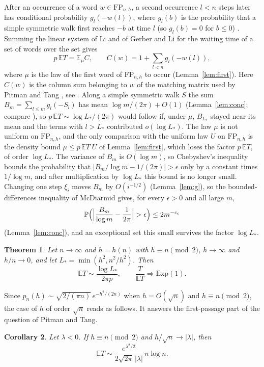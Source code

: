 \documentclass[11pt]{amsart}
\newtheorem{theorem}{Theorem}[section]
\newtheorem{corollary}[theorem]{Corollary}
\theoremstyle{remark}
\numberwithin{equation}{section}
\newcommand{\PP}{\mathbb{P}}
\newcommand{\EE}{\mathbb{E}}
\newcommand{\FP}{\mathrm{FP}}
\begin{document}
After an occurrence of a word $w\in\FP_{n,h}$, a second occurrence $l<n$ steps later has conditional probability $g_l(-w(l))$, where $g_l(b)$ is the probability that a simple symmetric walk first reaches $-b$ at time $l$ (so $g_l(b)=0$ for $b\le0$) \cite[Lemma~4.2]{Sh26}. Summing the linear system of Li \cite{Li} and of Gerber and Li \cite{GL} for the waiting time of a set of words over the set gives
\[
p\,\EE T=\EE_\mu C,\qquad C(w)=1+\sum_{l<n}g_l(-w(l)),
\]
where $\mu$ is the law of the first word of $\FP_{n,h}$ to occur (Lemma~\ref{lem:first}). Here $C(w)$ is the column sum belonging to $w$ of the matching matrix used by Pitman and Tang \cite[Section~2.4]{PT}, see \cite[Remark~5.1]{Sh26}. Along a simple symmetric walk $S$ the sum $B_m=\sum_{l\le m}g_l(-S_l)$ has mean $\log m/(2\pi)+O(1)$ (Lemma~\ref{lem:conc}; compare \cite[Lemma~3.1]{Sh26}), so $p\,\EE T\sim\log L_*/(2\pi)$ would follow if, under $\mu$, $B_{L_*}$ stayed near its mean and the terms with $l>L_*$ contributed $o(\log L_*)$. The law $\mu$ is not uniform on $\FP_{n,h}$, and the only comparison with the uniform law $U$ on $\FP_{n,h}$ is the density bound $\mu\le p\,\EE T\;U$ of Lemma~\ref{lem:first}, which loses the factor $p\,\EE T$, of order $\log L_*$. The variance of $B_m$ is $O(\log m)$, so Chebyshev's inequality bounds the probability that $|B_m/\log m-1/(2\pi)|>\epsilon$ only by a constant times $1/\log m$, and after multiplication by $\log L_*$ this bound is no longer small. Changing one step $\xi_i$ moves $B_m$ by $O(i^{-1/2})$ (Lemma~\ref{lem:g}), so the bounded-differences inequality of McDiarmid \cite{McD89} gives, for every $\epsilon>0$ and all large $m$,
\[
\PP\Bigl(\Bigl|\frac{B_m}{\log m}-\frac1{2\pi}\Bigr|>\epsilon\Bigr)\le2m^{-c_\epsilon}
\]
(Lemma~\ref{lem:conc}), and an exceptional set this small survives the factor $\log L_*$.

\begin{theorem}\label{thm:main}
Let $n\to\infty$ and $h=h(n)$ with $h\equiv n\pmod2$, $h\to\infty$ and $h/n\to0$, and let $L_*=\min(h^2,n^2/h^2)$. Then
\[
\EE T\sim\frac{\log L_*}{2\pi p},\qquad\frac{T}{\EE T}\Longrightarrow\mathrm{Exp}(1).
\]
\end{theorem}

Since $p_n(h)\sim\sqrt{2/(\pi n)}\,e^{-h^2/(2n)}$ when $h=O(\sqrt n)$ and $h\equiv n\pmod 2$, the case of $h$ of order $\sqrt n$ reads as follows. It answers the first-passage part of the question of Pitman and Tang.

\begin{corollary}\label{cor:diff}
Let $\lambda<0$. If $h\equiv n\pmod2$ and $h/\sqrt n\to|\lambda|$, then
\[
\EE T\sim\frac{e^{\lambda^2/2}}{2\sqrt{2\pi}\,|\lambda|}\,n\log n.
\]
\end{corollary}
\end{document}

